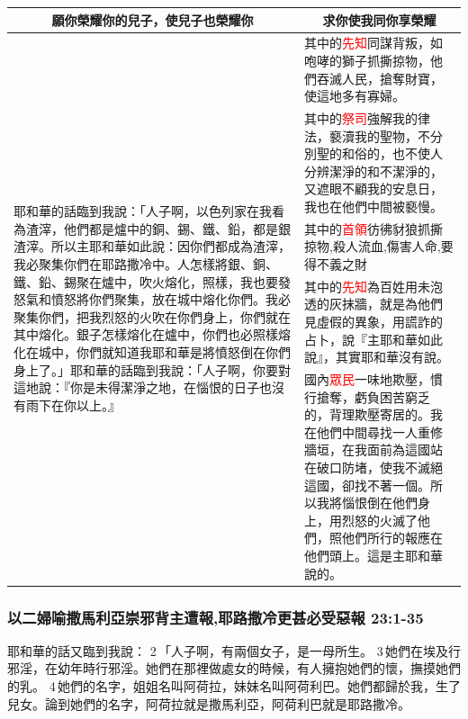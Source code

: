 \begin{table}[H]
\centering
\begin{tabular}{p{6.75cm}|p{10.25cm}}\hline\hline
\multicolumn{1}{c|}{願你榮耀你的兒子，使兒子也榮耀你}&\multicolumn{1}{c}{求你使我同你享榮耀}\\\hline
\multirow{5}{7.cm}{耶和華的話臨到我說：「人子啊，以色列家在我看為渣滓，他們都是爐中的銅、錫、鐵、鉛，都是銀渣滓。所以主耶和華如此說：因你們都成為渣滓，我必聚集你們在耶路撒冷中。人怎樣將銀、銅、鐵、鉛、錫聚在爐中，吹火熔化，照樣，我也要發怒氣和憤怒將你們聚集，放在城中熔化你們。我必聚集你們，把我烈怒的火吹在你們身上，你們就在其中熔化。銀子怎樣熔化在爐中，你們也必照樣熔化在城中，你們就知道我耶和華是將憤怒倒在你們身上了。」耶和華的話臨到我說：「人子啊，你要對這地說：『你是未得潔淨之地，在惱恨的日子也沒有雨下在你以上。』}
&其中的\textcolor{red}{先知}同謀背叛，如咆哮的獅子抓撕掠物，他們吞滅人民，搶奪財寶，使這地多有寡婦。\\\cline{2-2}
&其中的\textcolor{red}{祭司}強解我的律法，褻瀆我的聖物，不分別聖的和俗的，也不使人分辨潔淨的和不潔淨的，又遮眼不顧我的安息日，我也在他們中間被褻慢。\\\cline{2-2}
&其中的\textcolor{red}{首領}彷彿豺狼抓撕掠物,殺人流血,傷害人命,要得不義之財\\\cline{2-2}
&其中的\textcolor{red}{先知}為百姓用未泡透的灰抹牆，就是為他們見虛假的異象，用謊詐的占卜，說『主耶和華如此說』，其實耶和華沒有說。\\\cline{2-2}
&國內\textcolor{red}{眾民}一味地欺壓，慣行搶奪，虧負困苦窮乏的，背理欺壓寄居的。我在他們中間尋找一人重修牆垣，在我面前為這國站在破口防堵，使我不滅絕這國，卻找不著一個。所以我將惱恨倒在他們身上，用烈怒的火滅了他們，照他們所行的報應在他們頭上。這是主耶和華說的。\\\hline
\end{tabular}
\end{table}
 

\subsubsection{以二婦喻撒馬利亞崇邪背主遭報,耶路撒冷更甚必受惡報 23:1-35}
耶和華的話又臨到我說： 2 「人子啊，有兩個女子，是一母所生。 3 她們在埃及行邪淫，在幼年時行邪淫。她們在那裡做處女的時候，有人擁抱她們的懷，撫摸她們的乳。 4 她們的名字，姐姐名叫阿荷拉，妹妹名叫阿荷利巴。她們都歸於我，生了兒女。論到她們的名字，阿荷拉就是撒馬利亞，阿荷利巴就是耶路撒冷。

